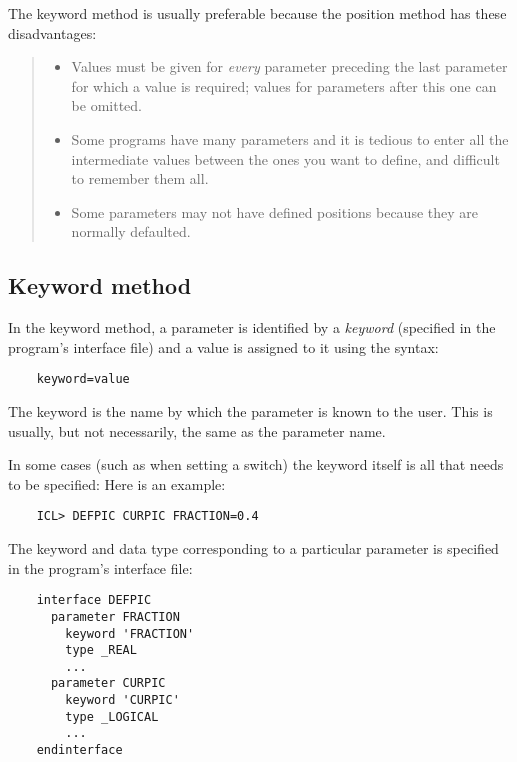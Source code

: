 The keyword method is usually preferable because the position method has these
disadvantages:
\begin{quote}
\begin{itemize}
\item Values must be given for {\em every} parameter preceding the
last parameter for which a value is required; values for parameters after
this one can be omitted.
\item Some programs have many parameters and it is tedious to enter all the
intermediate values between the ones you want to define, and difficult to
remember them all.
\item Some parameters may not have defined positions because they are normally
defaulted.
\end{itemize}
\end{quote}

\subsection{Keyword method}

In the keyword method, a parameter is identified by a {\em keyword} (specified
in the program's interface file) and a value is assigned to it using the syntax:

\begin{small}
\begin{verbatim}
    keyword=value
\end{verbatim}
\end{small}

The keyword is the name by which the parameter is known to the user.
This is usually, but not necessarily, the same as the parameter name.

In some cases (such as when setting a switch) the keyword itself is all that
needs to be specified:
Here is an example:

\begin{small}
\begin{verbatim}
    ICL> DEFPIC CURPIC FRACTION=0.4
\end{verbatim}
\end{small}

The keyword and data type corresponding to a particular parameter is specified
in the program's interface file:

\begin{small}
\begin{verbatim}
    interface DEFPIC
      parameter FRACTION
        keyword 'FRACTION'
        type _REAL
        ...
      parameter CURPIC
        keyword 'CURPIC'
        type _LOGICAL
        ...
    endinterface
\end{verbatim}
\end{small}


